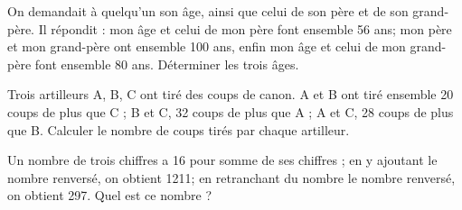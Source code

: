 \begin{exercice}
On demandait à quelqu’un son âge, ainsi que celui de son père et de son grand-père. Il répondit : mon âge et celui de mon père font ensemble 56 ans; mon père et mon grand-père ont ensemble 100  ans, enfin mon âge et celui de mon grand-père font ensemble 80 ans. Déterminer les trois âges.
\end{exercice}

\begin{exercice}
Trois artilleurs A, B, C ont tiré des coups de canon. A et B ont tiré ensemble 20 coups de plus que C ; B et C, 32 coups de plus que A ; A et C, 28 coups de plus que B. Calculer le nombre de coups tirés par chaque artilleur.
\end{exercice}

\begin{exercice}
Un nombre de trois chiffres a 16 pour somme de ses chiffres ; en y ajoutant le nombre renversé, on obtient 1211; en retranchant du nombre le nombre renversé, on obtient 297. Quel est ce nombre ?
\end{exercice}